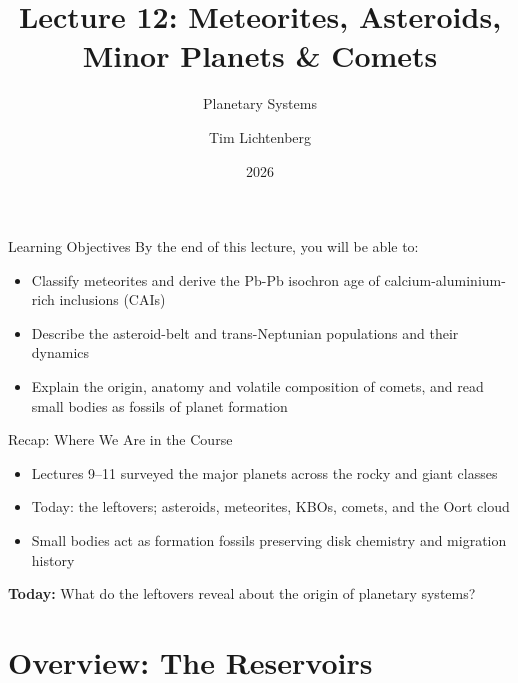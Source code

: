 \documentclass[aspectratio=169, 11pt]{beamer}
\title[Lecture 12: Small Bodies]{Lecture 12: Meteorites, Asteroids,\\Minor Planets \& Comets}
\subtitle{Planetary Systems}
\author[L12]{Tim Lichtenberg}
\institute{Kapteyn Astronomical Institute\\University of Groningen}
\date{2026}
\begin{document}
\begin{frame}
  \titlepage
\end{frame}

\begin{frame}{Learning Objectives}
  By the end of this lecture, you will be able to:
  \vskip8pt
  \begin{itemize}
    \item Classify meteorites and derive the Pb-Pb isochron age of calcium-aluminium-rich inclusions (CAIs)
    \item Describe the asteroid-belt and trans-Neptunian populations and their dynamics
    \item Explain the origin, anatomy and volatile composition of comets, and read small bodies as fossils of planet formation
  \end{itemize}
\end{frame}

\begin{frame}{Recap: Where We Are in the Course}
  \begin{itemize}
    \item Lectures 9--11 surveyed the major planets across the rocky and giant classes
    \item Today: the leftovers; asteroids, meteorites, KBOs, comets, and the Oort cloud
    \item Small bodies act as formation fossils preserving disk chemistry and migration history
  \end{itemize}
  \vskip8pt
  \textbf{Today:} What do the leftovers reveal about the origin of planetary systems?
\end{frame}


\section{Overview: The Reservoirs}

\begin{frame}
\end{frame}
\end{document}
